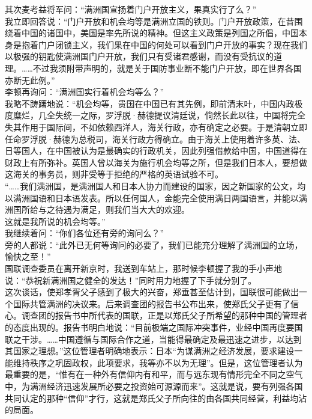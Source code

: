 其次麦考益将军问：“满洲国宣扬着门户开放主义，果真实行了么？”\\

我立即回答说：“门户开放和机会均等是满洲立国的铁则。门户开放政策，在昔围绕着中国的诸国中，美国是率先所说的精神。但这主义政策是列国之所倡，中国本身是抱着门户闭锁主义，我们果在中国的何处可以看到门户开放的事实？现在我们以极强的钥匙使满洲国门户开放，我们只有受诸君感谢，而没有受抗议的道理。……不过我须附带声明的，就是关于国防事业断不能门户开放，即在世界各国亦断无此例。”\\

李顿再询问：“满洲国实行着机会均等么？”\\

我略不踌躇地说：“机会均等，贵国在中国已有其先例，即前清末叶，中国内政极度糜烂，几全失统一之际，罗浮脱·赫德提议清廷说，倘然长此以往，中国将完全失其作用于国际间，不如依赖西洋人，海关行政，亦有确定之必要。于是清朝立即任命罗浮脱·赫德为总税司，海关行政方得确立。由于海关上使用着许多英、法、日等国人，在中国被认为是最确实的行政机关，因此列强借款给中国，中国道得在财政上有所弥补。英国人曾以海关为施行机会均等之所，但是我们日本人，要想做这海关的事务员，则非受等于拒绝的严格的英语试验不可。\\

“……我们满洲国，是满洲国人和日本人协力而建设的国家，因之新国家的公文，均以满洲国语和日本语发表。所以任何国人，金能完全使用满日两国语言，并能以满洲国所给与之待遇为满足，则我们当大大的欢迎。\\

这就是我所说的机会均等。”\\

我继续着问：“你们各位还有旁的询问么？”\\

旁的人都说：“此外已无何等询问的必要了，我们已能充分理解了满洲国的立场，愉快之至！”\\

国联调查委员在离开新京时，我送到车站上，那时候李顿握了我的手小声地说：“恭祝新满洲国之健全的发达！”同时用力地握了下手就分别了。\\

这次谈话，使郑孝胥父子感到了极大的兴奋，郑垂甚至估计到，国联很可能做出一个国际共管满洲的决议来。后来调查团的报告书公布出来，使郑氏父子更有了信心。调查团的报告书中所代表的国联，正是以郑氏父子所希望的那种中国的管理者的态度出现的。报告书明白地说：“目前极端之国际冲突事件，业经中国再度要国联之干涉。……中国遵循与国际合作之道，当能得最确定及最迅速之进步，以达到其国家之理想。”这位管理者明确地表示：日本“为谋满洲之经济发展，要求建设一能维持秩序之巩固政权，此项要求，我等亦不以为无理”。但是，这位管理者认为最重要的是，“惟有在一种外有信仰内有和平，而与远东现有情形完全不同之空气中，为满洲经济迅速发展所必要之投资始可源源而来”。这就是说，要有列强各国共同认定的那种“信仰”才行，这就是郑氏父子所向往的由各国共同经营，利益均沾的局面。\\

